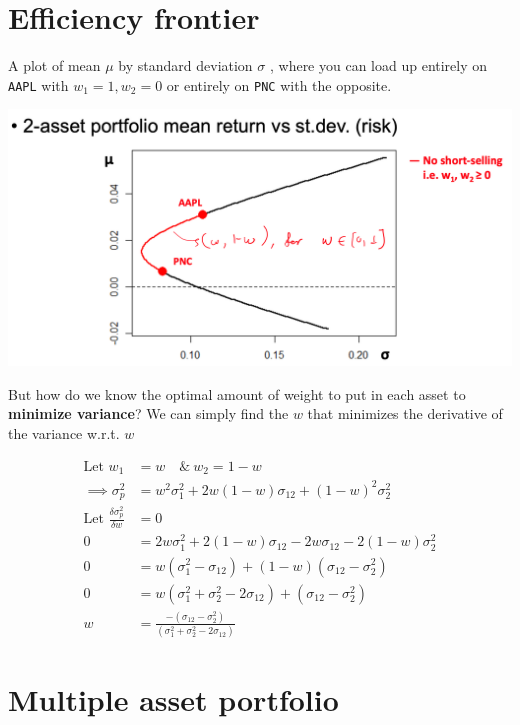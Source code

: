 \documentclass[
  oneside]{book}
\begin{document}
\hypertarget{efficiency-frontier}{%
\section{Efficiency frontier}\label{efficiency-frontier}}

A plot of mean \(\mu\) by standard deviation \(\sigma\) , where you can load up entirely on \texttt{AAPL} with \(w_{1}=1, w_{2}=0\) or entirely on \texttt{PNC} with the opposite.

\includegraphics{Notes/Obsidian-Attachments/5-Portfolio-Theory.png}

But how do we know the optimal amount of weight to put in each asset to \textbf{minimize variance}? We can simply find the \(w\) that minimizes the derivative of the variance w.r.t. \(w\)

\[
\begin{aligned}
\text{Let }w_{1} &= w \quad \& \ w_{2}=1-w\\
\implies \sigma_{p}^{2} &= w^{2}\sigma_{1}^{2} + 2w(1-w)\sigma_{12} + (1-w)^{2}\sigma_{2}^{2}\\
\text{Let }\frac{\delta \sigma_{p}^{2}}{\delta w} &= 0\\
0 &= 2w\sigma_{1}^{2}+2(1-w)\sigma_{12}-2w\sigma_{12}-2(1-w)\sigma_{2}^{2}\\
0 &= w(\sigma_{1}^{2}-\sigma_{12}) + (1-w)(\sigma_{12}-\sigma_{2}^{2})\\
0 &= w(\sigma_{1}^{2}+\sigma_{2}^{2}-2\sigma_{12}) + (\sigma_{12}-\sigma_{2}^{2})\\
w &= \frac{-(\sigma_{12}-\sigma_{2}^{2})}{(\sigma_{1}^{2}+\sigma_{2}^{2}-2\sigma_{12})}
\end{aligned}
\]

\hypertarget{multiple-asset-portfolio}{%
\section{Multiple asset portfolio}\label{multiple-asset-portfolio}}
\end{document}
